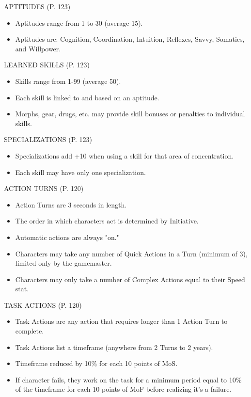 APTITUDES (P. 123)

\begin{itemize}
\item Aptitudes range from 1 to 30 (average 15).
\item Aptitudes are: Cognition, Coordination, Intuition, Reflexes,
  Savvy, Somatics, and Willpower.
\end{itemize}

LEARNED SKILLS (P. 123)

\begin{itemize}
\item Skills range from 1-99 (average 50).
\item Each skill is linked to and based on an aptitude.
\item Morphs, gear, drugs, etc. may provide skill bonuses or penalties
  to individual skills.
\end{itemize}

SPECIALIZATIONS (P. 123)

\begin{itemize}
\item Specializations add +10 when using a skill for that area of
  concentration.
\item Each skill may have only one specialization.
\end{itemize}

ACTION TURNS (P. 120)

\begin{itemize}
\item Action Turns are 3 seconds in length.
\item The order in which characters act is determined by Initiative.
\item Automatic actions are always "on."
\item Characters may take any number of Quick Actions in a Turn
  (minimum of 3), limited only by the gamemaster.
\item Characters may only take a number of Complex Actions equal to
  their Speed stat.
\end{itemize}

TASK ACTIONS (P. 120)

\begin{itemize}
\item Task Actions are any action that requires longer than 1 Action
  Turn to complete.
\item Task Actions list a timeframe (anywhere from 2 Turns to 2
  years).
\item Timeframe reduced by 10\% for each 10 points of MoS.
\item If character fails, they work on the task for a minimum period
  equal to 10\% of the timeframe for each 10 points of MoF before
  realizing it's a failure.
\end{itemize}

